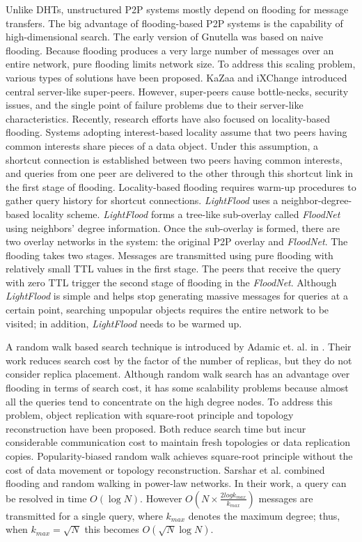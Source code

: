 Unlike DHTs, unstructured P2P systems mostly depend on flooding 
for message transfers. The big advantage of flooding-based P2P systems 
is the capability of high-dimensional search.
The early version of Gnutella was based on naive
flooding. Because flooding produces a very large number of
messages over an entire 
network, pure flooding limits network size. 
To address this scaling problem, various types of solutions have been 
proposed. KaZaa\cite{kazaa} and iXChange
\cite{JohnstoneSM05} introduced central server-like super-peers. 
However, super-peers cause bottle-necks, security issues, and the single 
point of failure problems due to their server-like characteristics. 
Recently, research efforts have also focused on locality-based flooding. Systems 
adopting interest-based locality\cite{Guo04,Guo05,SMZ03} assume that 
two peers having common interests share pieces of a data object. 
Under this assumption, a shortcut 
connection is established between two peers having common interests, 
and queries from one peer are delivered to the other through this 
shortcut link in the first stage of flooding. 
Locality-based flooding requires warm-up procedures to gather query 
history for shortcut connections. 
\textit{LightFlood}\cite{JiangGZW08} uses 
a neighbor-degree-based locality scheme. 
\textit{LightFlood} forms a tree-like sub-overlay called 
\textit{FloodNet} using neighbors' degree information. Once the sub-overlay 
is formed, there are two overlay networks in the system: the original 
P2P overlay and \textit{FloodNet}. The flooding takes two stages.
Messages are transmitted using pure flooding with relatively small TTL values 
in the first stage. The peers that receive the query with zero TTL trigger 
the second stage of flooding in the \textit{FloodNet}. Although 
\textit{LightFlood} is simple and helps stop generating massive messages 
for queries at a certain point, searching unpopular objects requires  
the entire network to be visited; in addition, \textit{LightFlood} needs to 
be warmed up.  

A random walk based search technique is introduced by Adamic et. al. 
in \cite{alph:powerlaw01}. 
Their work reduces search cost by the factor of the number of replicas, 
but they do not consider replica placement. 
Although random walk search has an advantage over flooding
in terms of search cost, it has some
scalability problems because almost all the queries tend to concentrate
on the high degree nodes. To address this problem, object
replication with square-root principle\cite{CohenS02,LCKS02}
and topology reconstruction\cite{Cooper05} have been proposed. 
Both reduce search time but incur considerable communication cost 
to maintain fresh topologies or data replication copies. 
Popularity-biased random walk\cite{zs:popularity06}
achieves square-root principle without the cost of data movement or
topology reconstruction. Sarshar et al. \cite{ns:percolation}
combined flooding and random walking in power-law networks. In their
work, a query can be resolved in time $O(\log N)$. However
$O(N\times \frac{2log k_{max}}{k_{max}})$ messages are
transmitted for a single query, where $k_{max}$ denotes the maximum
degree; thus, when $k_{max} = \sqrt{N}$ this becomes $O(\sqrt N \log N)$.

